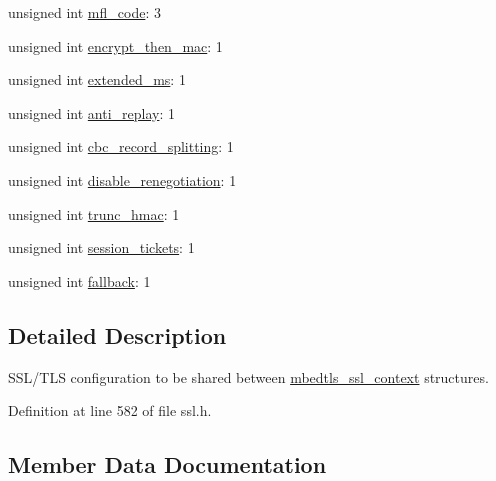 \begin{DoxyCompactItemize}
\item 
unsigned int \mbox{\hyperlink{structmbedtls__ssl__config_a67e52d2668c7f4bc4f6a872c35a679ab}{mfl\+\_\+code}}\+: 3
\item 
unsigned int \mbox{\hyperlink{structmbedtls__ssl__config_a8f9e666cb46e055bed2b799a94a85e3e}{encrypt\+\_\+then\+\_\+mac}}\+: 1
\item 
unsigned int \mbox{\hyperlink{structmbedtls__ssl__config_ac6ac2c30ac20fc9033913e0de6ffbe93}{extended\+\_\+ms}}\+: 1
\item 
unsigned int \mbox{\hyperlink{structmbedtls__ssl__config_af636d34975cc5ced1aa32cb424a37c67}{anti\+\_\+replay}}\+: 1
\item 
unsigned int \mbox{\hyperlink{structmbedtls__ssl__config_a053c327dda99451c6e82cda73e27d322}{cbc\+\_\+record\+\_\+splitting}}\+: 1
\item 
unsigned int \mbox{\hyperlink{structmbedtls__ssl__config_a953d3f0bbb40ed6f4020dc3e1a196dfb}{disable\+\_\+renegotiation}}\+: 1
\item 
unsigned int \mbox{\hyperlink{structmbedtls__ssl__config_a24bf9d624a2e2432518e9da8ae908db4}{trunc\+\_\+hmac}}\+: 1
\item 
unsigned int \mbox{\hyperlink{structmbedtls__ssl__config_a1b988bcd1b38c51cb802bf8af5d05c7b}{session\+\_\+tickets}}\+: 1
\item 
unsigned int \mbox{\hyperlink{structmbedtls__ssl__config_a0ca184f6088f938d7240157e8b4bbbab}{fallback}}\+: 1
\end{DoxyCompactItemize}


\subsection{Detailed Description}
S\+S\+L/\+T\+LS configuration to be shared between \mbox{\hyperlink{structmbedtls__ssl__context}{mbedtls\+\_\+ssl\+\_\+context}} structures. 

Definition at line 582 of file ssl.\+h.



\subsection{Member Data Documentation}
\mbox{\label{structmbedtls__ssl__config_afcd4e0685b3fca3c49043bdd6a84490f}} 
